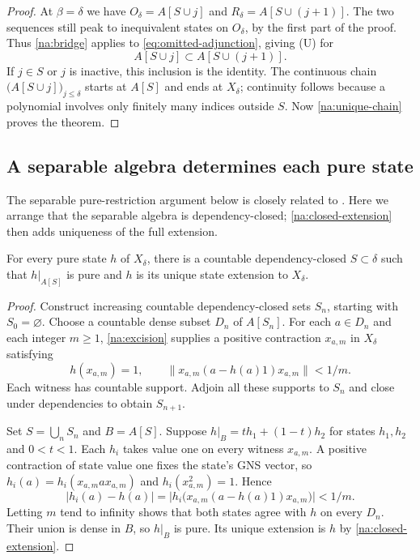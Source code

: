 \begin{proof}
At $\beta=\delta$ we have
$O_\delta=A[S\cup j]$ and
$R_\delta=A[S\cup(j+1)]$.
The two sequences still peak to inequivalent states on $O_\delta$,
by the first part of the proof. Thus \cref{na:bridge} applies to
\eqref{eq:omitted-adjunction}, giving \textup{(U)} for
\[
 A[S\cup j]\subset A[S\cup(j+1)].
\]
If $j\in S$ or $j$ is inactive, this inclusion is the identity.
The continuous chain $\bigl(A[S\cup j]\bigr)_{j\le\delta}$ starts
at $A[S]$ and ends at $X_\delta$; continuity follows because a
polynomial involves only finitely many indices outside $S$.
Now \cref{na:unique-chain} proves the theorem.
\end{proof}

\subsection{A separable algebra determines each pure state}

The separable pure-restriction argument below is closely related to
\cite[Proposition~2.3 and concluding Remark~1]{AkemannWassermannWeaver2010}.
Here we arrange that the separable algebra is dependency-closed;
\cref{na:closed-extension} then adds uniqueness of the full extension.

\begin{lemma}\label{na:countable-determination}
For every pure state $h$ of $X_\delta$, there is a countable
dependency-closed $S\subset\delta$ such that $h|_{A[S]}$ is pure
and $h$ is its unique state extension to $X_\delta$.
\end{lemma}
\begin{proof}
Construct increasing countable dependency-closed sets $S_n$, starting
with $S_0=\varnothing$. Choose a countable dense subset $D_n$ of
$A[S_n]$. For each $a\in D_n$ and each integer $m\ge1$,
\cref{na:excision} supplies a positive contraction $x_{a,m}$ in
$X_\delta$ satisfying
\[
 h(x_{a,m})=1,\qquad
 \bigl\|x_{a,m}(a-h(a)1)x_{a,m}\bigr\|<1/m.
\]
Each witness has countable support. Adjoin all these supports to
$S_n$ and close under dependencies to obtain $S_{n+1}$.

Set $S=\bigcup_n S_n$ and $B=A[S]$. Suppose
$h|_B=t h_1+(1-t)h_2$ for states $h_1,h_2$ and $0<t<1$.
Each $h_i$ takes value one on every witness $x_{a,m}$.
A positive contraction of state value one fixes the state's GNS
vector, so $h_i(a)=h_i(x_{a,m}a x_{a,m})$ and
$h_i(x_{a,m}^2)=1$. Hence
\[
 |h_i(a)-h(a)|
 =\bigl|h_i\bigl(x_{a,m}(a-h(a)1)x_{a,m}\bigr)\bigr|<1/m.
\]
Letting $m$ tend to infinity shows that both states agree with $h$
on every $D_n$. Their union is dense in $B$, so $h|_B$ is pure.
Its unique extension is $h$ by \cref{na:closed-extension}.
\end{proof}

